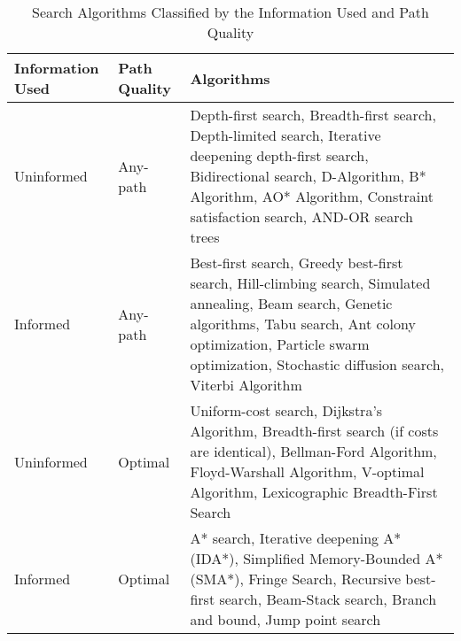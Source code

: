\documentclass[a4paper,UKenglish,cleveref, autoref, thm-restate]{qlinhta}
\begin{document}
    \begin{table}[h]
        \centering
        \begin{tabular}{|p{2cm}|p{3cm}|p{9.5cm}|}
            \hline
            \textbf{Information Used} & \textbf{Path Quality} & \textbf{Algorithms}                                                                                                                                                                                                                        \\
            \hline
            Uninformed                & Any-path              & Depth-first search, Breadth-first search, Depth-limited search, Iterative deepening depth-first search, Bidirectional search, D-Algorithm, B* Algorithm, AO* Algorithm, Constraint satisfaction search, AND-OR search trees                \\
            \hline
            Informed                  & Any-path              & Best-first search, Greedy best-first search, Hill-climbing search, Simulated annealing, Beam search, Genetic algorithms, Tabu search, Ant colony optimization, Particle swarm optimization, Stochastic diffusion search, Viterbi Algorithm \\
            \hline
            Uninformed                & Optimal               & Uniform-cost search, Dijkstra's Algorithm, Breadth-first search (if costs are identical), Bellman-Ford Algorithm, Floyd-Warshall Algorithm, V-optimal Algorithm, Lexicographic Breadth-First Search                                        \\
            \hline
            Informed                  & Optimal               & A* search, Iterative deepening A* (IDA*), Simplified Memory-Bounded A* (SMA*), Fringe Search, Recursive best-first search, Beam-Stack search, Branch and bound, Jump point search                                                          \\
            \hline
        \end{tabular}
        \caption{Search Algorithms Classified by the Information Used and Path Quality}
        \label{tab:search_algorithms_extended}
    \end{table}
\end{document}
